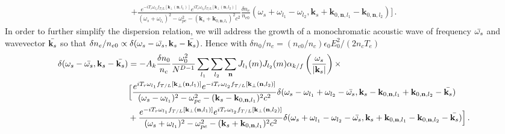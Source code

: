 \documentclass[
 reprint,
 amsmath,amssymb,
 aps,
]{revtex4-1}
\begin{document}
\begin{widetext}
\begin{align}
   + \frac{   e^{-iT_{r} \omega_{l_1}f_{T/L}[\mathbf{k}_\perp(\mathbf{n},l_1)]  }
  e^{iT_{r}  \omega_{l_2}f_{T/L}[\mathbf{k}_\perp(\mathbf{n},l_2)]  }
   }{(\omega_s+\omega_{l_1})^2 - \omega_{pe}^2 -(\mathbf{k}_s+ \mathbf{k}_{0,\mathbf{n},l_1})^2c^2} 
   \frac{\delta n_e }{n_{e0}}(\omega_s+\omega_{l_1}-\omega_{l_2},\mathbf{k}_s+\mathbf{k}_{0,\mathbf{n},l_1}-\mathbf{k}_{0,\mathbf{n},l_2}) 
   \Big]
   \, .\label{eq:fssd3}
\end{align}
In order to further simplify the dispersion relation, we will address the growth of a monochromatic acoustic wave  of frequency $\Bar{\omega_s}$ and wavevector $\Bar{\mathbf{k}_s}$ so that $\delta n_e/n_{e0}\propto \delta(\omega_s-\Bar{\omega_s}, {\mathbf{k}_s}-\Bar{\mathbf{k}_s})$. Hence    with $\delta n_0/n_{c} =(n_{e0}/n_c)\epsilon_0 E_0^2/ (2n_c T_e ) $
\begin{align}
   \delta(\omega_s-\Bar{\omega_s}, {\mathbf{k}_s}-\Bar{\mathbf{k}_s})
   &= -A_k \frac{\delta n_0}{n_c}\frac{\omega_0^2}{N^{D-1}}  \sum_{l_1}  \sum_{l_2} \sum_{\mathbf{n}}    J_{l_1}(m)J_{l_2}(m)\alpha_{k/f}\left(\frac{\omega_s}{\vert\mathbf{k}_s \vert} \right) \times \nonumber \\
  & \Big[  
     \frac{  e^{iT_{r} \omega_{l_1}f_{T/L}[\mathbf{k}_\perp(\mathbf{n},l_1)]  }
  e^{-iT_{r}  \omega_{l_2}f_{T/L}[\mathbf{k}_\perp(\mathbf{n},l_2)]  }
     }{(\omega_s-\omega_{l_1})^2 - \omega_{pe}^2 -(\mathbf{k}_s- \mathbf{k}_{0,\mathbf{n},l_1})^2c^2}
     \delta(\omega_s-\omega_{l_1}+\omega_{l_2}-\Bar{\omega_s}, \mathbf{k}_s-\mathbf{k}_{0,\mathbf{n},l_1}+\mathbf{k}_{0,\mathbf{n},l_2}-\Bar{\mathbf{k}_s}) \nonumber\\&
   + \frac{   e^{-iT_{r} \omega_{l_1}f_{T/L}[\mathbf{k}_\perp(\mathbf{n},l_1)]  }
  e^{iT_{r}  \omega_{l_2}f_{T/L}[\mathbf{k}_\perp(\mathbf{n},l_2)]  }
   }{(\omega_s+\omega_{l_1})^2 - \omega_{pe}^2 -(\mathbf{k}_s+ \mathbf{k}_{0,\mathbf{n},l_1})^2c^2} 
    \delta(\omega_s+\omega_{l_1}-\omega_{l_2}-\Bar{\omega_s}, \mathbf{k}_s+\mathbf{k}_{0,\mathbf{n},l_1}-\mathbf{k}_{0,\mathbf{n},l_2}-\Bar{\mathbf{k}_s}) 
   \Big]
   \, .\label{eq:fssd3}
\end{align}


\end{widetext}
\end{document}
